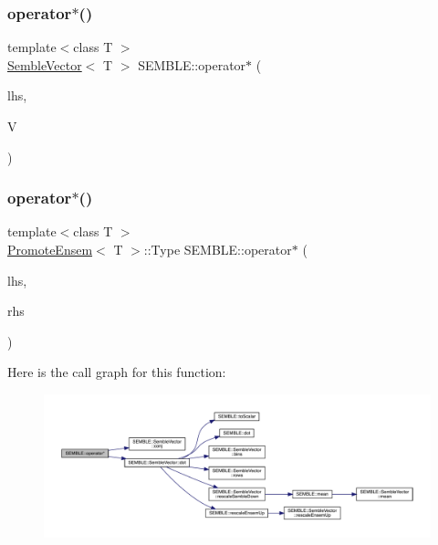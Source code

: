 \subsubsection{\texorpdfstring{operator$\ast$()}{operator*()}\hspace{0.1cm}{\footnotesize\ttfamily [8/20]}}
{\footnotesize\ttfamily template$<$class T $>$ \\
\mbox{\hyperlink{structSEMBLE_1_1SembleVector}{Semble\+Vector}}$<$ T $>$ S\+E\+M\+B\+L\+E\+::operator$\ast$ (\begin{DoxyParamCaption}\item[{const typename \mbox{\hyperlink{structSEMBLE_1_1PromoteEnsem}{Promote\+Ensem}}$<$ T $>$\+::Type \&}]{lhs,  }\item[{const \mbox{\hyperlink{structSEMBLE_1_1SembleVector}{Semble\+Vector}}$<$ T $>$ \&}]{V }\end{DoxyParamCaption})}

\mbox{\label{namespaceSEMBLE_a24f6d394103eca5835deaad4873c1f7b}} 
\subsubsection{\texorpdfstring{operator$\ast$()}{operator*()}\hspace{0.1cm}{\footnotesize\ttfamily [9/20]}}
{\footnotesize\ttfamily template$<$class T $>$ \\
\mbox{\hyperlink{structSEMBLE_1_1PromoteEnsem}{Promote\+Ensem}}$<$ T $>$\+::Type S\+E\+M\+B\+L\+E\+::operator$\ast$ (\begin{DoxyParamCaption}\item[{const \mbox{\hyperlink{structSEMBLE_1_1SembleVector}{Semble\+Vector}}$<$ T $>$ \&}]{lhs,  }\item[{const \mbox{\hyperlink{structSEMBLE_1_1SembleVector}{Semble\+Vector}}$<$ T $>$ \&}]{rhs }\end{DoxyParamCaption})}

Here is the call graph for this function\+:
\nopagebreak
\begin{figure}[H]
\begin{center}
\leavevmode
\includegraphics[width=350pt]{d7/dfd/namespaceSEMBLE_a24f6d394103eca5835deaad4873c1f7b_cgraph}
\end{center}
\end{figure}
\mbox{\label{namespaceSEMBLE_a23db5b999663ed20c851efe625716b04}} 
